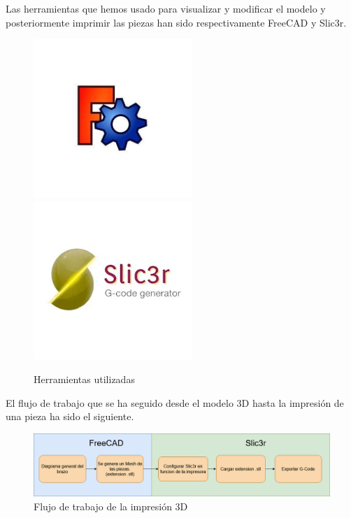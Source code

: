 Las herramientas que hemos usado para visualizar y modificar el modelo y posteriormente imprimir las piezas han sido respectivamente FreeCAD y Slic3r.

\begin{figure}[H]
    \centering
    \includegraphics[width=6cm]{pictures/freeCAD.jpg}
    \includegraphics[width=6cm]{pictures/slic3r_logo.jpg}
    \caption{Herramientas utilizadas}
    \label{fig:herramientas_3d}
\end{figure}

El flujo de trabajo que se ha seguido desde el modelo 3D hasta la impresión de una pieza ha sido el siguiente.

\begin{figure}[H]
    \centering
    \includegraphics[width=.9\linewidth]{pictures/flujo_trabajo_impresion.png}
    \caption{Flujo de trabajo de la impresión 3D}
    \label{fig:flujo_3d}
\end{figure}

